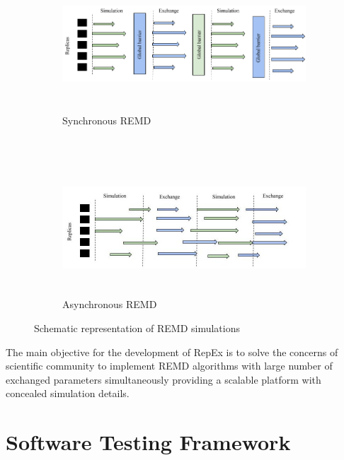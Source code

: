 \documentclass[10pt]{ruthesis}
\begin{document}
\begin{figure}

\begin{subfigure}{.5\textwidth}
  \centering
  \includegraphics[width=16cm,height=5cm]{Sync.png}
  \caption{Synchronous REMD}
  \label{fig:sync}
\end{subfigure}%
\\
\begin{subfigure}{.5\textwidth}
  \centering
  \includegraphics[width=16cm,height=5cm]{async.jpg}
  \caption{Asynchronous REMD}
  \label{fig:async}
\end{subfigure}
\caption{Schematic representation of REMD simulations \cite{ref5}}
\label{fig:repex}
\end{figure}


The main objective for the development of RepEx is to solve the concerns of scientific community to implement REMD algorithms with large number of exchanged parameters simultaneously providing a scalable platform with concealed simulation details.


\chapter{Software Testing Framework}
\end{document}
